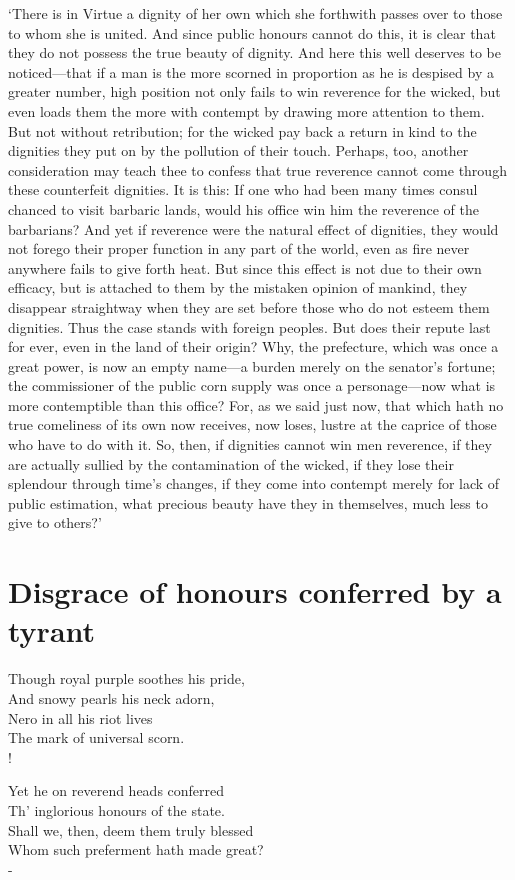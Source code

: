 \documentclass[12pt]{book}
\newenvironment{vpoem}[1]%
  {\def\poemvsindentlines{#1}\begin{poem}\small}%
  {\end{poem}\def\poemvsindentlines{\relax}}
\begin{document}
`There is in Virtue a dignity of her own which she forthwith passes over
to those to whom she is united. And since public honours cannot do this,
it is clear that they do not possess the true beauty of dignity. And
here this well deserves to be noticed---that if a man is the more scorned
in proportion as he is despised by a greater number, high position not
only fails to win reverence for the wicked, but even loads them the more
with contempt by drawing more attention to them. But not without
retribution; for the wicked pay back a return in kind to the dignities
they put on by the pollution of their touch. Perhaps, too, another
consideration may teach thee to confess that true reverence cannot come
through these counterfeit dignities. It is this: If one who had been
many times consul chanced to visit barbaric lands, would his office win
him the reverence of the barbarians? And yet if reverence were the
natural effect of dignities, they would not forego their proper function
in any part of the world, even as fire never anywhere fails to give
forth heat. But since this effect is not due to their own efficacy, but
is attached to them by the mistaken opinion of mankind, they disappear
straightway when they are set before those who do not esteem them
dignities. Thus the case stands with foreign peoples. But does their
repute last for ever, even in the land of their origin? Why, the
prefecture, which was once a great power, is now an empty name---a burden
merely on the senator's fortune; the commissioner of the public corn
supply was once a personage---now what is more contemptible than this
office? For, as we said just now, that which hath no true comeliness of
its own now receives, now loses, lustre at the caprice of those who have
to do with it. So, then, if dignities cannot win men reverence, if they
are actually sullied by the contamination of the wicked, if they lose
their splendour through time's changes, if they come into contempt
merely for lack of public estimation, what precious beauty have they in
themselves, much less to give to others?'




\section{Disgrace of honours conferred by a tyrant}

\begin{vpoem}{24}
    Though royal purple soothes his pride, \\
      And snowy pearls his neck adorn, \\
    Nero in all his riot lives \\
      The mark of universal scorn. \\!

    Yet he on reverend heads conferred \\
      Th' inglorious honours of the state. \\
    Shall we, then, deem them truly blessed \\
      Whom such preferment hath made great? \\-
\end{vpoem}
\end{document}
